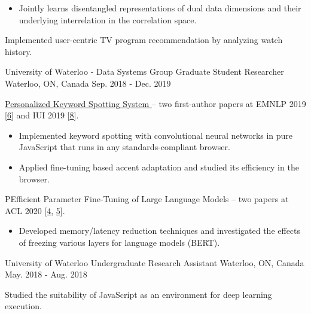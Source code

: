 \begin{cventries}
{\begin{cvitems}
\begin{itemize}[label=$\cdot$,leftmargin=0.7em]
\item {Jointly learns disentangled representations of dual data dimensions and their underlying interrelation in the correlation space.}
\end{itemize}
\item {Implemented user-centric TV program recommendation by analyzing watch history.}
\end{cvitems}
}
\cventry
{University of Waterloo - Data Systems Group} %
{Graduate Student Researcher} %
{Waterloo, ON, Canada} %
{Sep. 2018 - Dec. 2019} %
{ %
\begin{cvitems}
\item {\href{https://github.com/castorini/honkling}{Personalized Keyword Spotting System {\small \faGithub}} -- two first-author papers at EMNLP 2019 [\hyperlink{honkling:EMNLP}{6}] and IUI 2019 [\hyperlink{honkling:IUI}{8}].}
\begin{itemize}[label=$\cdot$,leftmargin=0.7em]
\item {Implemented keyword spotting with convolutional neural networks in pure JavaScript that runs in any standards-compliant browser.}
\item {Applied fine-tuning based accent adaptation and studied its efficiency in the browser.}
\end{itemize}
\item {PEfficient Parameter Fine-Tuning of Large Language Models -- two papers at ACL 2020 [\hyperlink{show:ACL}{4}, \hyperlink{DeeBERT:ACL}{5}].}
\begin{itemize}[label=$\cdot$,leftmargin=0.7em]
\item {Developed memory/latency reduction techniques and investigated the effects of freezing various layers for language models (BERT).}
\end{itemize}
\end{cvitems}
}
\cventry
{University of Waterloo} %
{Undergraduate Research Assistant} %
{Waterloo, ON, Canada} %
{May. 2018 - Aug. 2018} %
{ %
\begin{cvitems}
\item {Studied the suitability of JavaScript as an environment for deep learning execution.}
\end{cvitems}
}
\end{cventries}
